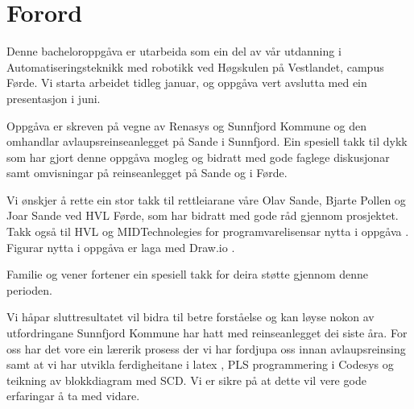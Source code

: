 \chapter{Forord}
\thispagestyle{romanpages}

Denne bacheloroppgåva er utarbeida som ein del av vår utdanning i Automatiseringsteknikk med robotikk ved Høgskulen på Vestlandet, campus Førde.
Vi starta arbeidet tidleg januar, og oppgåva vert avslutta med ein presentasjon i juni.

Oppgåva er skreven på vegne av \gls{Renasys} \citep{Renasys} og \gls{Sunnfjord Kommune} \citep{SunnfjordKommune} og den omhandlar 
avlaupsreinseanlegget på Sande i Sunnfjord. 
Ein spesiell takk til dykk som har gjort denne oppgåva mogleg og
bidratt med gode faglege diskusjonar samt omvisningar på reinseanlegget på Sande og i Førde.

Vi ønskjer å rette ein stor takk til rettleiarane våre Olav Sande, Bjarte Pollen og Joar Sande ved \gls{HVL} Førde, som har bidratt med gode råd gjennom prosjektet.
Takk også til \gls{HVL} \citep{HVL} og MIDTechnolegies \citep{MIDT} for programvarelisensar nytta i oppgåva \citep{MIDTToolbox} \citep{Microsoft}.
Figurar nytta i oppgåva er laga med Draw.io \citep{DrawIO}.

Familie og vener fortener ein spesiell takk for deira støtte gjennom denne perioden.

Vi håpar sluttresultatet vil bidra til betre forståelse og kan løyse nokon av utfordringane \gls{Sunnfjord Kommune} har hatt med reinseanlegget dei siste åra.
For oss har det vore ein lærerik prosess der vi har fordjupa oss innan avlaupsreinsing samt at vi har utvikla ferdigheitane i \gls{latex} \citep{MikTeX} \citep{VisualStudio}, 
\gls{PLS} programmering i \gls{Codesys} \citep{Codesys} og teikning av blokkdiagram med \gls{SCD}. Vi er sikre på at dette vil vere gode erfaringar å ta med vidare.
 